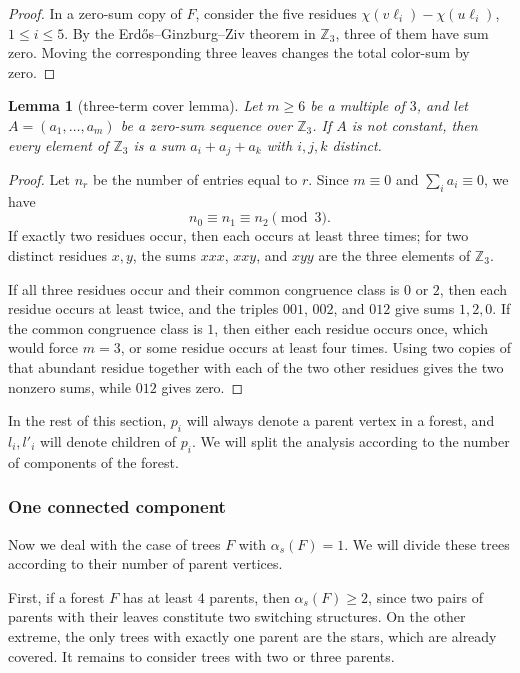 \documentclass[11pt]{article}
\newtheorem{lemma}[theorem]{Lemma}
\newcommand{\Z}{\mathbb Z}
\begin{document}
\begin{proof}
In a zero-sum copy of $F$, consider the five residues $\chi(v\ell_i)-\chi(u\ell_i)$, $1\le i\le5$.  By the Erd\H{o}s--Ginzburg--Ziv theorem in $\Z_3$, three of them have sum zero.  Moving the corresponding three leaves changes the total color-sum by zero.
\end{proof}

\begin{lemma}[three-term cover lemma]\label{lem:cover}
Let $m\ge6$ be a multiple of $3$, and let $A=(a_1,\ldots,a_m)$ be a zero-sum sequence over $\Z_3$.  If $A$ is not constant, then every element of $\Z_3$ is a sum $a_i+a_j+a_k$ with $i,j,k$ distinct.
\end{lemma}

\begin{proof}
Let $n_r$ be the number of entries equal to $r$.  Since $m\equiv0$ and $\sum_i a_i\equiv0$, we have
\[
        n_0\equiv n_1\equiv n_2\pmod3.
\]
If exactly two residues occur, then each occurs at least three times; for two distinct residues $x,y$, the sums $xxx$, $xxy$, and $xyy$ are the three elements of $\Z_3$.

If all three residues occur and their common congruence class is $0$ or $2$, then each residue occurs at least twice, and the triples $001$, $002$, and $012$ give sums $1,2,0$.  If the common congruence class is $1$, then either each residue occurs once, which would force $m=3$, or some residue occurs at least four times.  Using two copies of that abundant residue together with each of the two other residues gives the two nonzero sums, while $012$ gives zero.
\end{proof}

In the rest of this section, $p_i$ will always denote a parent vertex in a forest, and $l_i,l'_i$ will denote children of $p_i$. We will split the analysis according to the number of components of the forest.

\subsubsection{One connected component}\label{subsubsec:1comp}

Now we deal with the case of trees $F$ with $\alpha_s(F)=1$. We will divide these trees according to their number of parent vertices.

First, if a forest $F$ has at least $4$ parents, then $\alpha_s(F) \geq 2$, since two pairs of parents with their leaves constitute two switching structures. On the other extreme, the only trees with exactly one parent are the stars, which are already covered. It remains to consider trees with two or three parents.
\end{document}
